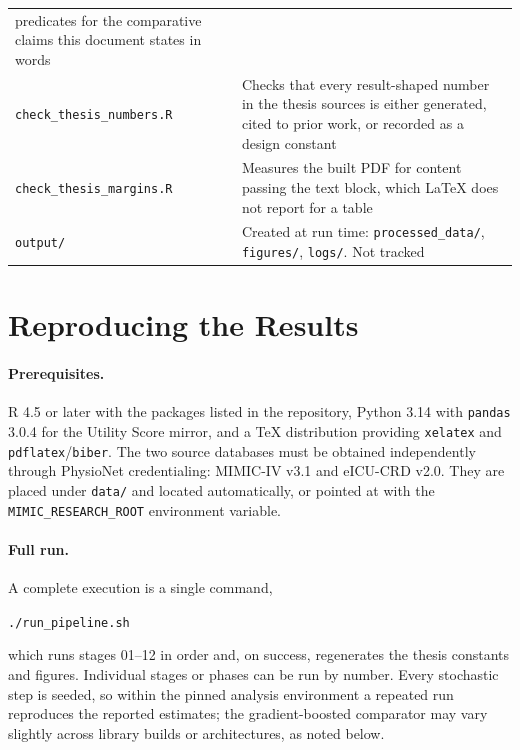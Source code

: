 {\begin{longtable}{p{4.6cm}p{8.4cm}}
        predicates for the comparative claims this document states in words \\
        \addlinespace
        \texttt{check\_thesis\_numbers.R} &
        Checks that every result-shaped number in the thesis sources is either
        generated, cited to prior work, or recorded as a design constant \\
        \addlinespace
        \texttt{check\_thesis\_margins.R} &
        Measures the built PDF for content passing the text block, which
        \LaTeX{} does not report for a table \\
        \addlinespace
        \texttt{output/} &
        Created at run time: \texttt{processed\_data/}, \texttt{figures/},
        \texttt{logs/}. Not tracked \\
\end{longtable}
}

\section{Reproducing the Results}
\label{app:repro}

\paragraph{Prerequisites.} R 4.5 or later with the packages listed in the
repository, Python 3.14 with \texttt{pandas} 3.0.4 for the Utility Score
mirror, and a \TeX{} distribution providing \texttt{xelatex} and
\texttt{pdflatex}/\texttt{biber}. The two source databases must be obtained
independently through PhysioNet credentialing: MIMIC-IV v3.1 and eICU-CRD
v2.0. They are placed under \texttt{data/} and located automatically, or
pointed at with the \texttt{MIMIC\_RESEARCH\_ROOT} environment variable.

\paragraph{Full run.} A complete execution is a single command,

\begin{center}\texttt{./run\_pipeline.sh}\end{center}

\noindent
which runs stages 01--12 in order and, on success, regenerates the thesis
constants and figures. Individual stages or phases can be run by number. Every
stochastic step is seeded, so within the pinned analysis environment a repeated
run reproduces the reported estimates; the gradient-boosted comparator may vary
slightly across library builds or architectures, as noted below.

